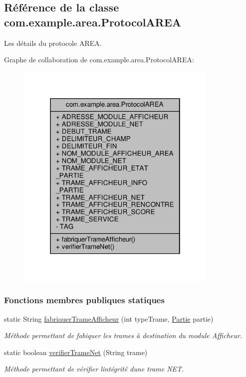 \hypertarget{classcom_1_1example_1_1area_1_1_protocol_a_r_e_a}{}\subsection{Référence de la classe com.\+example.\+area.\+Protocol\+A\+R\+EA}
\label{classcom_1_1example_1_1area_1_1_protocol_a_r_e_a}


Les détails du protocole A\+R\+EA.  




Graphe de collaboration de com.\+example.\+area.\+Protocol\+A\+R\+EA\+:
\nopagebreak
\begin{figure}[H]
\begin{center}
\leavevmode
\includegraphics[width=274pt]{classcom_1_1example_1_1area_1_1_protocol_a_r_e_a__coll__graph}
\end{center}
\end{figure}
\subsubsection*{Fonctions membres publiques statiques}
\begin{DoxyCompactItemize}
\item 
static String \hyperlink{classcom_1_1example_1_1area_1_1_protocol_a_r_e_a_a3d4245d57e6b03b022e72c3ab9b2bc34}{fabriquer\+Trame\+Afficheur} (int type\+Trame, \hyperlink{classcom_1_1example_1_1area_1_1_partie}{Partie} partie)
\begin{DoxyCompactList}\small\item\em Méthode permettant de fabiquer les trames à destination du module Afficheur. \end{DoxyCompactList}\item 
static boolean \hyperlink{classcom_1_1example_1_1area_1_1_protocol_a_r_e_a_af675efbe6d33699aa34c01f6223fa711}{verifier\+Trame\+Net} (String trame)
\begin{DoxyCompactList}\small\item\em Méthode permettant de vérifier l\textquotesingle{}intégrité d\textquotesingle{}une trame N\+ET. \end{DoxyCompactList}\end{DoxyCompactItemize}
